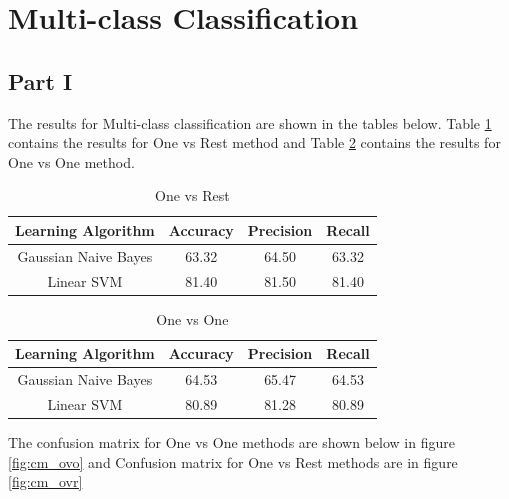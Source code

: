\documentclass[11pt]{article}
\begin{document}
\newpage
\section{Multi-class Classification}
\subsection{Part I}

The results for Multi-class classification are shown in the tables below. Table \ref{table:ovr_res} contains the results for One vs Rest method and Table \ref{table:ovo_res} contains the results for One vs One method.

\begin{table}[h]
	\centering
	\begin{tabular}{|c|c|c|c|} \hline
		Learning Algorithm & Accuracy & Precision & Recall\\ \hline
		Gaussian Naive Bayes & 63.32 & 64.50 & 63.32 \\
		Linear SVM & 81.40 & 81.50 & 81.40 \\
		\hline
		\end{tabular}
		\caption{One vs Rest}
		\label{table:ovr_res}
\end{table}

\begin{table}[h]
	\centering
	\begin{tabular}{|c|c|c|c|} \hline
		Learning Algorithm & Accuracy & Precision & Recall\\ \hline
		Gaussian Naive Bayes & 64.53 & 65.47 & 64.53 \\
		Linear SVM & 80.89 & 81.28 & 80.89 \\
		\hline
	\end{tabular}
	\caption{One vs One}
	\label{table:ovo_res}
\end{table}

The confusion matrix for One vs One methods are shown below in figure \ref{fig:cm_ovo} and Confusion matrix for One vs Rest methods are in figure \ref{fig:cm_ovr}
\end{document}

